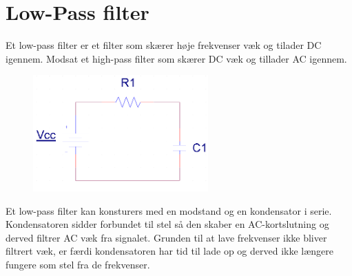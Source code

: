 \section{Low-Pass filter}

Et low-pass filter er et filter som skærer høje frekvenser væk og tilader DC igennem. Modsat et high-pass filter som skærer DC væk og tillader AC igennem. 

\begin{figure}[h!]
  \centering
  \includegraphics[width=0.6\textwidth]{figures/low_pass_schematic.png}
\end{figure}

Et low-pass filter kan konsturers med en modstand og en kondensator i serie. Kondensatoren sidder forbundet til stel så den skaber en AC-kortslutning og derved filtrer AC væk fra signalet. Grunden til at lave frekvenser ikke bliver filtrert væk, er færdi kondensatoren har tid til lade op og derved ikke længere fungere som stel fra de frekvenser.


